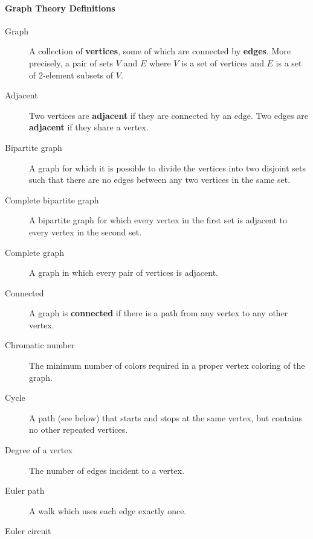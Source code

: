 \documentclass[10pt,]{book}
\newcommand{\terminology}[1]{\textbf{#1}}
\theoremstyle{plain}
\theoremstyle{definition}
\theoremstyle{definition}
\theoremstyle{definition}
\theoremstyle{definition}
\numberwithin{equation}{chapter}
\begin{document}
\paragraph[{Graph Theory Definitions}]{Graph Theory Definitions}\hypertarget{paragraphs-6}{}
\hypertarget{p-81}{}%
\leavevmode%
\begin{description}
\item[{Graph}]\hypertarget{li-11}{}\hypertarget{p-82}{}%
 A collection of \terminology{vertices}, some of which are connected by \terminology{edges}. More precisely, a pair of sets \(V\) and \(E\) where \(V\) is a set of vertices and \(E\) is a set of 2-element subsets of \(V\).%
\item[{Adjacent}]\hypertarget{li-12}{}\hypertarget{p-83}{}%
 Two vertices are \terminology{adjacent} if they are connected by an edge. Two edges are \terminology{adjacent} if they share a vertex.%
\item[{Bipartite graph}]\hypertarget{li-13}{}\hypertarget{p-84}{}%
 A graph for which it is possible to divide the vertices into two disjoint sets such that there are no edges between any two vertices in the same set.%
\item[{Complete bipartite graph}]\hypertarget{li-14}{}\hypertarget{p-85}{}%
A bipartite graph for which every vertex in the first set is adjacent to every vertex in the second set.%
\item[{Complete graph}]\hypertarget{li-15}{}\hypertarget{p-86}{}%
 A graph in which every pair of vertices is adjacent.%
\item[{Connected}]\hypertarget{li-16}{}\hypertarget{p-87}{}%
 A graph is \terminology{connected} if there is a path from any vertex to any other vertex.%
\item[{Chromatic number}]\hypertarget{li-17}{}\hypertarget{p-88}{}%
 The minimum number of colors required in a proper vertex coloring of the graph.%
\item[{Cycle}]\hypertarget{li-18}{}\hypertarget{p-89}{}%
 A path (see below) that starts and stops at the same vertex, but contains no other repeated vertices.%
\item[{Degree of a vertex}]\hypertarget{li-19}{}\hypertarget{p-90}{}%
 The number of edges incident to a vertex.%
\item[{Euler path}]\hypertarget{li-20}{}\hypertarget{p-91}{}%
A walk which uses each edge exactly once.%
\item[{Euler circuit}]\hypertarget{li-21}{}\hypertarget{p-92}{}%

\end{description}
\end{document}
